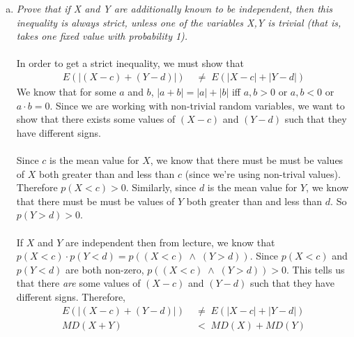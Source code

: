 \documentclass[a4paper]{article}
\begin{document}
\begin{enumerate}
\begin{enumerate}[(a)]
	\item \emph{Prove that if X and Y are additionally known to be independent, then this inequality is always strict, unless one of the variables X,Y is trivial (that is, takes one fixed value with probability 1).} \\
        \\
        In order to get a strict inequality, we must show that 
        \begin{align*}
 E(|(X-c)+(Y-d)|) \;&\neq\; E(|X-c|+|Y-d|)
\end{align*}
	We know that for some $a$ and $b$, $|a+b| = |a| + |b|$ iff $a,b >0$ or $ a,b < 0$ or $a \cdot b = 0$. Since we are working with non-trivial random variables, we want to show that there exists some values of $(X-c)$ and $(Y-d)$ such that they have different signs. \\
    \\
    Since $c$ is the mean value for $X$, we know that there must be must be values of $X$ both greater than and less than $c$ (since we're using non-trival values). Therefore $p(X < c) > 0$. Similarly, since $d$ is the mean value for $Y$, we know that there must be must be values of $Y$ both greater than and less than $d$. So $p(Y > d) > 0$. \\
    \\
        If $X$ and $Y$ are independent then from lecture, we know that $p(X < c) \cdot p(Y < d) = p((X < c) \;\land\; (Y > d))$. Since $p(X < c)$ and $p(Y < d)$ are both non-zero, $p((X < c) \;\land\; (Y > d)) > 0$. This tells us that there \emph{are} some values of $(X-c)$ and $(Y-d)$ such that they have different signs. Therefore,
                \begin{align*}
 E(|(X-c)+(Y-d)|) \;&\neq\; E(|X-c|+|Y-d|) \\
MD(X+Y) \;&<\; MD(X) + MD(Y)
\end{align*}
        
        
        
	\end{enumerate}






\end{enumerate}
\end{document}
